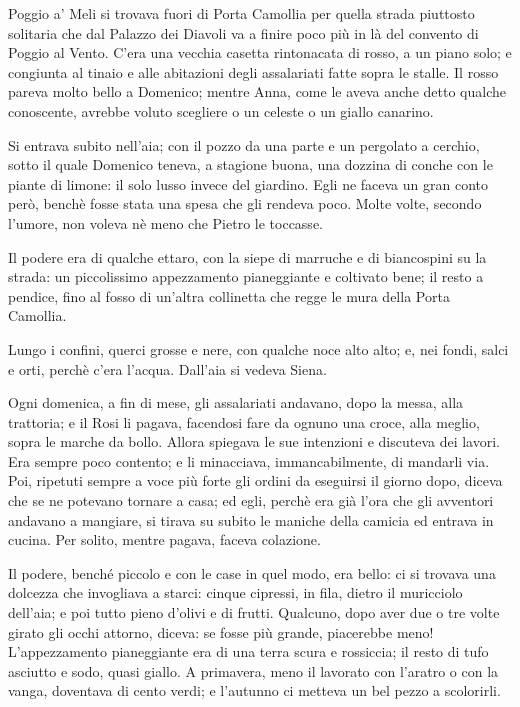 Poggio a' Meli si trovava fuori di Porta Camollia per quella strada piuttosto solitaria che dal Palazzo dei Diavoli va a finire poco più in là del convento di Poggio al Vento. C'era una vecchia casetta rintonacata di rosso, a un piano solo; e congiunta al tinaio e alle abitazioni degli assalariati fatte sopra le stalle. Il rosso pareva molto bello a Domenico; mentre Anna, come le aveva anche detto qualche conoscente, avrebbe voluto scegliere o un celeste o un giallo canarino.

Si entrava subito nell'aia; con il pozzo da una parte e un pergolato a cerchio, sotto il quale Domenico teneva, a stagione buona, una dozzina di conche con le piante di limone: il solo lusso invece del giardino. Egli ne faceva un gran conto però, benchè fosse stata una spesa che gli rendeva poco. Molte volte, secondo l'umore, non voleva nè meno che Pietro le toccasse.

Il podere era di qualche ettaro, con la siepe di marruche e di biancospini su la strada: un piccolissimo appezzamento pianeggiante e coltivato bene; il resto a pendice, fino al fosso di un'altra collinetta che regge le mura della Porta Camollia.

Lungo i confini, querci grosse e nere, con qualche noce alto alto; e, nei fondi, salci e orti, perchè c'era l'acqua. Dall'aia si vedeva Siena.

Ogni domenica, a fin di mese, gli assalariati andavano, dopo la messa, alla trattoria; e il Rosi li pagava, facendosi fare da ognuno una croce, alla meglio, sopra le marche da bollo. Allora spiegava le sue intenzioni e discuteva dei lavori. Era sempre poco contento; e li minacciava, immancabilmente, di mandarli via. Poi, ripetuti sempre a voce più forte gli ordini da eseguirsi il giorno dopo, diceva che se ne potevano tornare a casa; ed egli, perchè era già l'ora che gli avventori andavano a mangiare, si tirava su subito le maniche della camicia ed entrava in cucina. Per solito, mentre pagava, faceva colazione.

Il podere, benché piccolo e con le case in quel modo, era bello: ci si trovava una dolcezza che invogliava a starci: cinque cipressi, in fila, dietro il muricciolo dell'aia; e poi tutto pieno d'olivi e di frutti. Qualcuno, dopo aver due o tre volte girato gli occhi attorno, diceva: se fosse più grande, piacerebbe meno! L'appezzamento pianeggiante era di una terra scura e rossiccia; il resto di tufo asciutto e sodo, quasi giallo. A primavera, meno il lavorato con l'aratro o con la vanga, doventava di cento verdi; e l'autunno ci metteva un bel pezzo a scolorirli.

